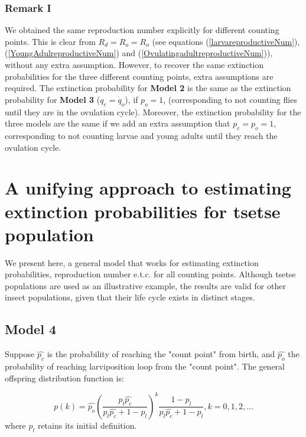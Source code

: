 \documentclass[smallextended]{svjour3}
\begin{document}
\subsubsection*{\bf Remark I}
We obtained the same reproduction number explicitly for different counting points. This is clear from  $R_{d} = R_{o}=R_{o}$ (see equations (\ref{larvareproductiveNum}), (\ref{YoungAdulreproductiveNum}) and (\ref{OvulatingadultreproductiveNum})), without any extra assumption. However, to recover the same extinction probabilities for the three different counting points, extra assumptions are required. The extinction probability for {\bf Model 2} is the same as the extinction probability for {\bf Model 3} ($q_{e} =q_{o}$), if $p_{o} = 1$, (corresponding to not counting flies until they are in the ovulation cycle). Moreover, the extinction probability for the three models are the same if we add an extra assumption that $p_{c} =p_{o} = 1$, corresponding to not counting larvae and young adults until they reach the ovulation cycle. \\


\section{\bf A unifying approach to estimating extinction probabilities for tsetse population}

We present here, a general model that works for estimating extinction probabilities, reproduction number e.t.c.   for all counting points. Although tsetse populations are used as an illustrative example, the results are valid for other insect populations, given that their life cycle exists in distinct stages. 


\subsection{\bf Model 4}
Suppose $\hat{p_c}$ is the probability of reaching the "count point" from birth, and $\hat{p_o}$ the
probability of reaching larviposition loop from the "count point". The general offspring distribution function is: 


\begin{equation}
\label{Unifydistfunction} 
p(k) = \hat{p_o}(\frac{p_{l}\hat{p_c}}{p_{l}\hat{p_c}+1-p_{l}})^{k}\frac{1-p_{l}}{p_{l}\hat{p_c}+1-p_{l}},  k =0,1,2,...
\end{equation} 
where $p_{l}$ retains its initial definition. 
\end{document}
